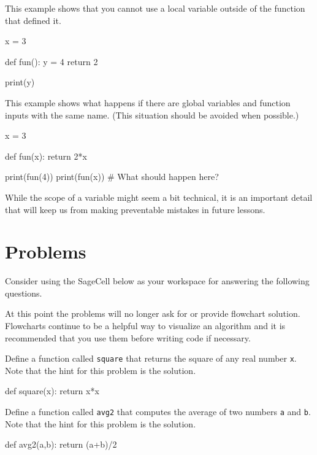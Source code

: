 \documentclass{ximera}
\begin{document}
This example shows that you cannot use a local variable outside of the function that defined it.

\begin{sageCell}
x = 3

def fun():
        y = 4
        return 2

print(y)
\end{sageCell}

This example shows what happens if there are global variables and function inputs with the same name. (This situation should be avoided when possible.)

\begin{sageCell}
x = 3

def fun(x):
	return 2*x

print(fun(4))
print(fun(x))     # What should happen here?
\end{sageCell}

While the scope of a variable might seem a bit technical, it is an important detail that will keep us from making preventable mistakes in future lessons.

\section{Problems}

Consider using the SageCell below as your workspace for answering the following questions. 

At this point the problems will no longer ask for or provide flowchart solution. Flowcharts continue to be a helpful way to visualize an algorithm and it is recommended that you use them before writing code if necessary. 

\begin{question}
	Define a function called \verb|square| that returns the square of any real number \verb|x|. Note that the hint for this problem is the solution.
	\begin{hint}
\begin{sageCell}
def square(x):
        return x*x
\end{sageCell}
	\end{hint}
\end{question}

\begin{question}
	Define a function called \verb|avg2| that computes the average of two numbers \verb|a| and \verb|b|. Note that the hint for this problem is the solution.
	\begin{hint}
\begin{sageCell}
def avg2(a,b):
        return (a+b)/2
\end{sageCell}
	\end{hint}
\end{question}
\end{document}
